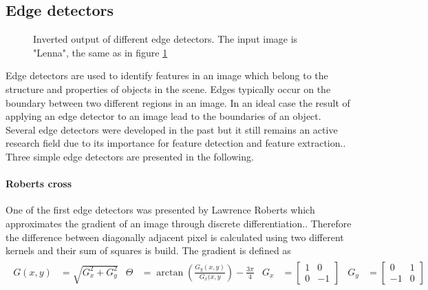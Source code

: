 \subsection{Edge detectors}
\begin{figure}[h]
\centering
  \hfill
  \hfill
  \hfill
  \caption{Inverted output of different edge detectors. The input image is "Lenna", the same as in figure \ref{Logical squares}\label{Logical squares}}
\end{figure}
Edge detectors are used to identify features in an image which belong to the structure and properties of objects in the scene. Edges typically occur on the boundary between two different regions in an image. In an ideal case the result of applying an edge detector to an image lead to the boundaries of an object. Several edge detectors were developed in the past but it still remains an active research field due to its importance for feature detection and feature extraction.\cite{Beyerer2016}\cite{Gonzalez2002}. Three simple edge detectors are presented in the following. 
\paragraph{Roberts cross}
One of the first edge detectors was presented by Lawrence Roberts which approximates the gradient of an image through discrete differentiation.\cite{Roberts1965a}. Therefore the difference between diagonally adjacent pixel is calculated using two different kernels and their sum of squares is build. The gradient is defined as 
\begin{align}
\begin{aligned}
G(x,y) &= \sqrt{G_x^2 + G_y^2}  & 
\Theta &= \arctan{(\frac{G_y(x,y)}{G_x(x,y})} - \frac{3\pi}{4} &
G_x &= \begin{bmatrix} 1  & 0 \\ 0  & -1 \end{bmatrix} & 
G_y &= \begin{bmatrix} 0  & 1 \\ -1 & 0 \end{bmatrix}
\end{aligned}
\end{align}

